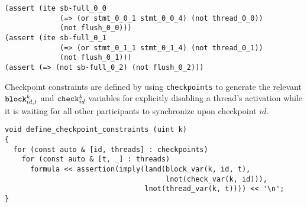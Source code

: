 \begin{lstlisting}[language=SMTLib]
(assert (ite sb-full_0_0
             (=> (or stmt_0_0_1 stmt_0_0_4) (not thread_0_0))
             (not flush_0_0)))
(assert (ite sb-full_0_1
             (=> (or stmt_0_1_1 stmt_0_1_4) (not thread_0_1))
             (not flush_0_1)))
(assert (=> (not sb-full_0_2) (not flush_0_2)))
\end{lstlisting}



\noindent
Checkpoint constraints are defined by using \texttt{checkpoints} to generate the relevant $\texttt{block}^k_{id, t}$ and $\texttt{check}^k_{id}$ variables for explicitly disabling a thread's activation while it is waiting for all other participants to synchronize upon checkpoint $id$.

\begin{lstlisting}[style=c++]
void define_checkpoint_constraints (uint k)
{
  for (const auto & [id, threads] : checkpoints)
    for (const auto & [t, _] : threads)
      formula << assertion(imply(land(block_var(k, id, t),
                                      lnot(check_var(k, id))),
                                 lnot(thread_var(k, t)))) << '\n';
}
\end{lstlisting}


